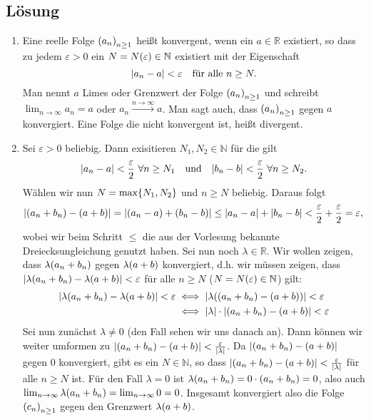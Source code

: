 \documentclass[german,12pt]{homework}
\newcommand{\NN}{\mathbb{N}}
\newcommand{\RR}{\mathbb{R}}
\DeclarePairedDelimiter{\absolute}{\lvert}{\rvert}
\DeclarePairedDelimiter{\enbrace}{(}{)}
\DeclarePairedDelimiter{\penbrace}{\{}{\}}
\begin{document}
    \subsection*{Lösung}
    \begin{enumerate}
        \item Eine reelle Folge \(\enbrace*{a_n}_{n \ge 1}\) heißt konvergent, wenn ein \(a \in \RR\) existiert, so dass zu jedem \(\varepsilon > 0\) ein \(N = N\enbrace*{\varepsilon} \in \NN\) existiert mit der Eigenschaft
        \[\absolute*{a_n - a} < \varepsilon \quad \text{für alle }n \ge N.\]
        Man nennt \(a\) Limes oder Grenzwert der Folge \(\enbrace*{a_n}_{n \ge 1}\) und schreibt \(\lim_{n \to \infty}a_n = a\) oder \(a_n \xrightarrow{n \to \infty} a\). Man sagt auch, dass \(\enbrace*{a_n}_{n \ge 1}\) gegen \(a\) konvergiert. Eine Folge die nicht konvergent ist, heißt divergent.
        \item Sei \(\varepsilon > 0\) beliebig. Dann exisitieren \(N_1, N_2 \in \NN\) für die gilt
        \[\absolute*{a_n - a} < \frac{\varepsilon}{2}\ \forall{n \ge N_1} \quad \text{und} \quad \absolute*{b_n - b} < \frac{\varepsilon}{2}\ \forall{n \ge N_2}.\]
        Wählen wir nun \(N = \max\penbrace*{N_1, N_2}\) und \(n \ge N\) beliebig. Daraus folgt
        \[\absolute*{\enbrace*{a_n + b_n} - \enbrace*{a + b}} = \absolute*{\enbrace*{a_n - a} + \enbrace*{b_n - b}} \le \absolute*{a_n - a} + \absolute*{b_n - b} < \frac{\varepsilon}{2} + \frac{\varepsilon}{2} = \varepsilon,\]
        wobei wir beim Schritt \(\le\) die aus der Vorlesung bekannte Dreiecksungleichung genutzt haben. Sei nun noch \(\lambda \in \RR\). Wir wollen zeigen, dass \(\lambda\enbrace*{a_n + b_n}\) gegen \(\lambda\enbrace*{a + b}\) konvergiert, d.h. wir müssen zeigen, dass \(\absolute*{\lambda\enbrace*{a_n + b_n} - \lambda\enbrace*{a + b}} < \varepsilon\) für alle \(n \ge N\) (\(N = N\enbrace*{\varepsilon} \in \NN\)) gilt:
        \begin{align*}
            \absolute*{\lambda\enbrace*{a_n + b_n} - \lambda\enbrace*{a + b}} < \varepsilon &\iff \absolute*{\lambda\enbrace*{\enbrace*{a_n + b_n} - \enbrace*{a + b}}} < \varepsilon\\
            &\iff \absolute*{\lambda} \cdot \absolute*{\enbrace*{a_n + b_n} - \enbrace*{a + b}} < \varepsilon
        \end{align*}
        Sei nun zunächst \(\lambda \ne 0\) (den Fall sehen wir uns danach an). Dann können wir weiter umformen zu \(\absolute*{\enbrace*{a_n + b_n} - \enbrace*{a + b}} < \frac{\varepsilon}{\absolute*{\lambda}}\). Da \(\absolute*{\enbrace*{a_n + b_n} - \enbrace*{a + b}}\) gegen \(0\) konvergiert, gibt es ein \(N \in \NN\), so dass \(\absolute*{\enbrace*{a_n + b_n} - \enbrace*{a + b}} < \frac{\varepsilon}{\absolute*{\lambda}}\) für alle \(n \ge N\) ist. Für den Fall \(\lambda = 0\) ist \(\lambda\enbrace*{a_n + b_n} = 0 \cdot \enbrace*{a_n + b_n} = 0\), also auch \(\lim_{n \to \infty}\lambda\enbrace*{a_n + b_n} = \lim_{n \to \infty}0 = 0\). Insgesamt konvergiert also die Folge \(\enbrace*{c_n}_{n \ge 1}\) gegen den Grenzwert \(\lambda\enbrace*{a + b}\).
    \end{enumerate}
  
\end{document}
